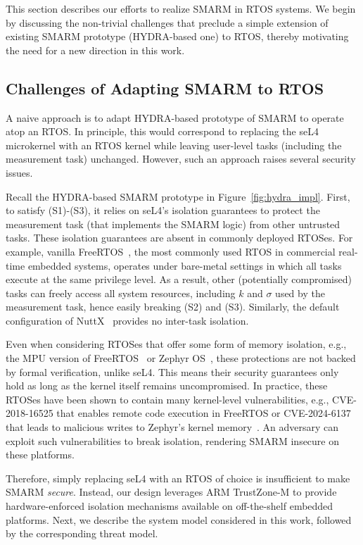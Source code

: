 \documentclass{ieeeaccess}
\begin{document}
This section describes our efforts to realize SMARM in RTOS systems.
We begin by discussing the non-trivial challenges that preclude a simple extension of existing SMARM prototype (HYDRA-based one) to RTOS, thereby motivating the need for a new direction in this work.




\subsection{Challenges of Adapting SMARM to RTOS}\label{subsec:naive}

A naive approach is to adapt HYDRA-based prototype of SMARM to operate atop an RTOS.
In principle, this would correspond to replacing the seL4 microkernel with an RTOS kernel while leaving user-level tasks (including the measurement task) unchanged.
However, such an approach raises several security issues.


Recall the HYDRA-based SMARM prototype in Figure~\ref{fig:hydra_impl}.
First, to satisfy (S1)-(S3), it relies on seL4's isolation guarantees to protect the measurement task (that implements the SMARM logic) from other untrusted tasks.
These isolation guarantees are absent in commonly deployed RTOSes.
For example, vanilla FreeRTOS~\cite{freertos}, the most commonly used RTOS in commercial real-time embedded systems, operates under bare-metal settings in which all tasks execute at the same privilege level.
As a result, other (potentially compromised) tasks can freely access all system resources, including $k$ and $\sigma$ used by the measurement task, hence easily breaking (S2) and (S3).
Similarly, the default configuration of NuttX~\cite{nuttx} provides no inter-task isolation.

Even when considering RTOSes that offer some form of memory isolation, e.g., the MPU version of FreeRTOS~\cite{freertos-mpu} or Zephyr OS~\cite{zephyr}, these protections are not backed by formal verification, unlike seL4.
This means their security guarantees only hold as long as the kernel itself remains uncompromised.
In practice, these RTOSes have been shown to contain many kernel-level vulnerabilities, e.g., CVE-2018-16525 that enables remote code execution in FreeRTOS or CVE-2024-6137 that leads to malicious writes to Zephyr's kernel memory~\cite{cve_freertos_rce,cve_zephyr_memory}.
An adversary can exploit such vulnerabilities to break isolation, rendering SMARM insecure on these platforms.

Therefore, simply replacing seL4 with an RTOS of choice is insufficient to make SMARM \emph{secure}.
Instead, our design leverages ARM TrustZone-M to provide hardware-enforced isolation mechanisms available on off-the-shelf embedded platforms.
Next, we describe the system model considered in this work, followed by the corresponding threat model.
\end{document}
